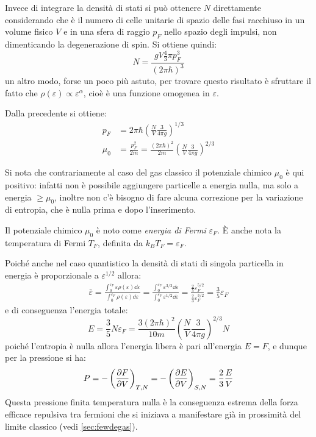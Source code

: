 Invece di integrare la densità di stati si può ottenere $N$ direttamente considerando che è il numero di celle unitarie di spazio delle fasi racchiuso in un volume fisico $V$ e in una sfera di raggio $p_F$ nello spazio degli impulsi, non dimenticando la degenerazione di spin. Si ottiene quindi:
\begin{equation*}
N = \frac{gV \frac{4}{3} \pi p_F^3}{(2\pi \hbar)^3}
\end{equation*}
un altro modo, forse un poco più astuto, per trovare questo risultato è sfruttare il fatto che $ \rho(\varepsilon) \propto \varepsilon^\alpha $, cioè è una funzione omogenea in $ \varepsilon $.

\noindent Dalla precedente si ottiene:
\begin{align*}
p_F &= 2\pi \hbar \left(\frac{N}{V} \frac{3}{4\pi g}\right)^{1/3}\\
\mu_0 &= \frac{p_F^2}{2m} = \frac{(2\pi \hbar)^2}{2m} \left(\frac{N}{V} \frac{3}{4\pi g}\right)^{2/3}
\end{align*}

Si nota che contrariamente al caso del gas classico il potenziale chimico $\mu_0$ è qui positivo: infatti non è possibile aggiungere particelle a energia nulla, ma solo a energia $\geq \mu_0$, inoltre non c'è bisogno di fare alcuna correzione per la variazione di entropia, che è nulla prima e dopo l'inserimento.

Il potenziale chimico $\mu_0$ è noto come \textit{energia di Fermi} $\varepsilon_F$. \`E anche nota la temperatura di Fermi $T_F$, definita da $k_B T_F = \varepsilon_F$.
\newline

Poiché anche nel caso quantistico la densità di stati di singola particella in energia è proporzionale a $\varepsilon^{1/2}$ allora:
\begin{align*}
	\bar{\varepsilon} = \frac{\int_{0}^{\varepsilon_F} \varepsilon \rho(\varepsilon) \dd \varepsilon}{\int_{0}^{\varepsilon_F} \rho(\varepsilon) \dd \varepsilon} = \frac{\int_{0}^{\varepsilon_F} \varepsilon^{3/2} \dd \varepsilon}{\int_{0}^{\varepsilon_F} \varepsilon^{1/2} \dd \varepsilon} = \frac{\frac{2}{5} \varepsilon_F^{5/2}}{\frac{2}{3} \varepsilon_F^{3/2}} = \frac{3}{5} \varepsilon_F
\end{align*}
e di conseguenza l'energia totale:
\begin{equation*}
E = \frac{3}{5} N \varepsilon_F = \frac{3(2\pi \hbar)^2}{10m} \left(\frac{N}{V} \frac{3}{4\pi g}\right)^{2/3} N
\end{equation*}
poiché l'entropia è nulla allora l'energia libera è pari all'energia $E=F$, e dunque per la pressione si ha:
\begin{equation}
P = - \left(\frac{\partial {F}}{\partial {V}}\right)_{T,N} = - \left(\frac{\partial {E}}{\partial {V}}\right)_{S,N} = \frac{2}{3} \frac{E}{V}
\end{equation}
Questa pressione finita temperatura nulla è la conseguenza estrema della forza efficace repulsiva tra fermioni che si iniziava a manifestare già in prossimità del limite classico (vedi \cref{sec:fewdegas}).

